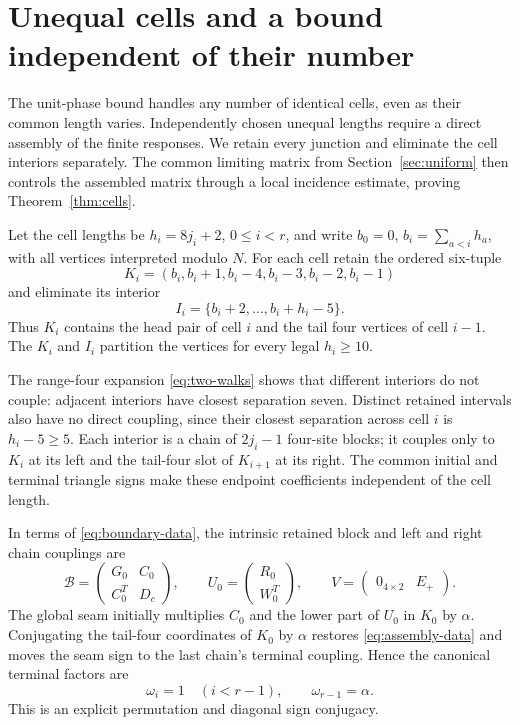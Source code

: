 \section{Unequal cells and a bound independent of their number}
\label{sec:cells}

The unit-phase bound handles any number of identical cells, even as their
common length varies. Independently chosen unequal lengths require a
direct assembly of the finite responses. We retain every junction and
eliminate the cell interiors separately. The common limiting matrix from
Section~\ref{sec:uniform} then controls the assembled matrix through a
local incidence estimate, proving Theorem~\ref{thm:cells}.

Let the cell lengths be $h_i=8j_i+2$, $0\le i<r$, and write
$b_0=0$, $b_i=\sum_{a<i}h_a$, with all vertices interpreted modulo $N$.
For each cell retain the ordered six-tuple
\begin{equation}
 K_i=(b_i,b_i+1,b_i-4,b_i-3,b_i-2,b_i-1)
 \label{eq:retained}
\end{equation}
and eliminate its interior
\[
 I_i=\{b_i+2,\ldots,b_i+h_i-5\}.
\]
Thus $K_i$ contains the head pair of cell $i$ and the tail four vertices
of cell $i-1$. The $K_i$ and $I_i$ partition the vertices for every
legal $h_i\ge10$.

The range-four expansion \eqref{eq:two-walks} shows that different
interiors do not couple: adjacent interiors have closest separation seven.
Distinct retained intervals also have no direct coupling, since their
closest separation across cell $i$ is $h_i-5\ge5$.
Each interior is a chain of $2j_i-1$ four-site blocks; it couples only
to $K_i$ at its left and the tail-four slot of $K_{i+1}$ at its right.
The common initial and terminal triangle signs make these endpoint
coefficients independent of the cell length.

In terms of \eqref{eq:boundary-data}, the intrinsic retained block and
left and right chain couplings are
\begin{equation}
 \mathcal B=\begin{pmatrix}G_0&C_0\\C_0^T&D_c\end{pmatrix},
 \qquad U_0=\begin{pmatrix}R_0\\W_0^T\end{pmatrix},
 \qquad V=\begin{pmatrix}0_{4\times2}&E_+\end{pmatrix}.
 \label{eq:assembly-data}
\end{equation}
The global seam initially multiplies $C_0$ and the lower part of $U_0$
in $K_0$ by $\alpha$. Conjugating the tail-four coordinates of $K_0$ by
$\alpha$ restores \eqref{eq:assembly-data} and moves the seam sign to the
last chain's terminal coupling. Hence the canonical terminal factors are
\[
 \omega_i=1\quad(i<r-1),\qquad\omega_{r-1}=\alpha.
\]
This is an explicit permutation and diagonal sign conjugacy.


